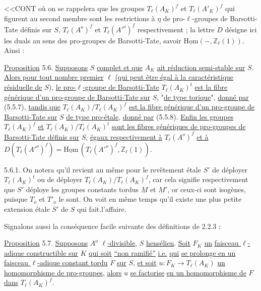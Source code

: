 
<<CONT où on se rappelera que les groupes $T_\ell(A_K)^f$ et $T_\ell(A'_K)^f$ qui figurent au second membre sont les restrictions à $\eta$ de pro-$\ell$-groupes de Barsotti-Tate définis sur $S$, $T_\ell(A^o)^f$ et $T_\ell({A'}^o)^f$ respectivement ; la lettre $D$ désigne ici les duals au sens des pro-groupes de Barsotti-Tate, savoir $\underline{\mathrm{Hom}}( - , \mathbb{Z}_\ell(1))$. Ainsi :

\underline{Proposition} 5.6. \underline{Supposons} $S$ \underline{complet et que} $A_K$ \underline{ait réduction semi-stable sur} $S$. \underline{Alors pour tout nombre premier} $\ell$ \underline{(qui peut être égal à la caractéristique résiduelle de} $S$), \underline{le pro-$\ell$-groupe de Barsotti-Tate} $T_\ell(A_K)^t$ \underline{est la fibre générique d'un pro-groupe de Barsotti-Tate sur} $S$, "\underline{de type torique}", \underline{donné par} (5.5.7), \underline{tandis que} $T_\ell(A_K)/T_\ell(A_K)^f$ \underline{est la fibre générique d'un pro-groupe de Barsotti-Tate sur} $S$ \underline{de type pro-étale}, \underline{donné par} (5.5.8). \underline{Enfin les groupes} $T_\ell(A_K)^f$ \underline{et} $T_\ell(A_K)/T_\ell(A_K)^t$ \underline{sont les fibres génériques de pro-groupes de Barsotti-Tate définis sur} $S$, \underline{égaux respectivement à} $T_\ell(A^o)^f$ \underline{et à} $D(T_\ell({A'}^o)^f) = \underline{\mathrm{Hom}}\,(T_\ell({A'}^o)^f, \mathbb{Z}_\ell(1))$.

5.6.1. On notera qu'il revient au même pour le revêtement étale $S'$ de déployer $T_\ell(A_K)^t$ ou de déployer $T_\ell(A_K)/T_\ell(A_K)^f$, car cela signifie respectivement que $S'$ déploye les groupes constants tordus $\underline{M}$ et $\underline{M}'$, or ceux-ci sont isogènes, puisque $T_o$ et $T'_o$ le sont. On voit en même temps qu'il existe une plus petite extension étale $S'$ de $S$ qui fait.l'affaire.

Signalons aussi la conséquence facile suivante des définitions de 2.2.3 :



\underline{Proposition} 5.7.  \underline{Supposons} $A^o$ \underline{$\ell$-divisible}, $S$ \underline{hensélien}. \underline{Soit} $F_K$ \underline{un} \underline{faisceau $\ell$-adique constructible sur} $K$ \underline{qui soit} \underline{``non ramifié''} \underline{i.e.} \underline{qui} \underline{se prolonge en un faisceau $\ell$-adique constant tordu} $F$ \underline{sur} $S$, \underline{et soit} $u: F_K \longrightarrow T_\ell(A_K)$ \underline{un homomorphisme de pro-groupes}, \underline{alors} $u$ \underline{se factorise} \underline{en un homomorphisme de} $F$ \underline{dans} $T_\ell(A_K)^f$.

